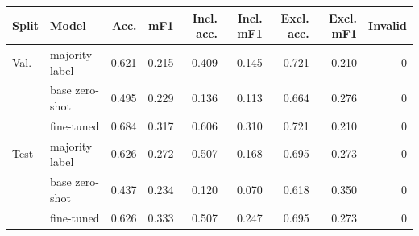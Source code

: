 \begin{tabular}{llrrrrrrr}\toprule
Split & Model & Acc. & mF1 & Incl. acc. & Incl. mF1 & Excl. acc. & Excl. mF1 & Invalid \\\midrule
Val. & majority label & 0.621 & 0.215 & 0.409 & 0.145 & 0.721 & 0.210 & 0 \\
& base zero-shot & 0.495 & 0.229 & 0.136 & 0.113 & 0.664 & 0.276 & 0 \\
& fine-tuned & 0.684 & 0.317 & 0.606 & 0.310 & 0.721 & 0.210 & 0 \\
\midrule
Test & majority label & 0.626 & 0.272 & 0.507 & 0.168 & 0.695 & 0.273 & 0 \\
& base zero-shot & 0.437 & 0.234 & 0.120 & 0.070 & 0.618 & 0.350 & 0 \\
& fine-tuned & 0.626 & 0.333 & 0.507 & 0.247 & 0.695 & 0.273 & 0 \\
\bottomrule\end{tabular}
